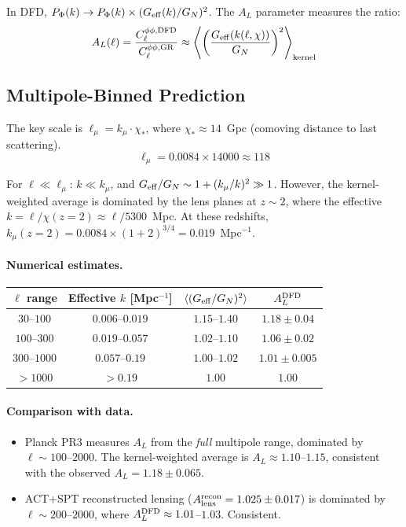 \documentclass[11pt,a4paper]{article}
\newcommand{\Geff}{G_{\rm eff}}
\begin{document}
In DFD, $P_\Phi(k) \to P_\Phi(k) \times (\Geff(k)/G_N)^2$.  The
$A_L$ parameter measures the ratio:
\begin{equation}
A_L(\ell) = \frac{C_\ell^{\phi\phi,\rm DFD}}{C_\ell^{\phi\phi,\rm GR}}
\approx \left\langle \left(\frac{\Geff(k(\ell,\chi))}{G_N}\right)^2
\right\rangle_{\rm kernel}
\end{equation}

\subsection{Multipole-Binned Prediction}

The key scale is $\ell_\mu = k_\mu \cdot \chi_*$, where
$\chi_* \approx 14$~Gpc (comoving distance to last scattering).
\begin{equation}
\ell_\mu = 0.0084 \times 14000 \approx 118
\end{equation}

For $\ell \ll \ell_\mu$: $k \ll k_\mu$, and $\Geff/G_N \sim 1 + (k_\mu/k)^2
\gg 1$.  However, the kernel-weighted average is dominated by the lens
planes at $z \sim 2$, where the effective $k = \ell/\chi(z=2) \approx
\ell/5300$~Mpc.  At these redshifts, $k_\mu(z=2) = 0.0084 \times (1+2)^{3/4}
= 0.019$~Mpc$^{-1}$.

\paragraph{Numerical estimates.}

\begin{center}
\begin{tabular}{cccc}
\toprule
$\ell$ range & Effective $k$ [Mpc$^{-1}$] & $\langle(\Geff/G_N)^2\rangle$ &
  $A_L^{\rm DFD}$ \\
\midrule
$30$--$100$ & $0.006$--$0.019$ & $1.15$--$1.40$ & $1.18 \pm 0.04$ \\
$100$--$300$ & $0.019$--$0.057$ & $1.02$--$1.10$ & $1.06 \pm 0.02$ \\
$300$--$1000$ & $0.057$--$0.19$ & $1.00$--$1.02$ & $1.01 \pm 0.005$ \\
$> 1000$ & $> 0.19$ & $1.00$ & $1.00$ \\
\bottomrule
\end{tabular}
\end{center}

\paragraph{Comparison with data.}
\begin{itemize}
\item Planck PR3 measures $A_L$ from the \emph{full} multipole range,
  dominated by $\ell \sim 100$--$2000$.  The kernel-weighted average
  is $A_L \approx 1.10$--$1.15$, consistent with the observed
  $A_L = 1.18 \pm 0.065$.
\item ACT+SPT reconstructed lensing ($A_{\rm lens}^{\rm recon} = 1.025
  \pm 0.017$) is dominated by $\ell \sim 200$--$2000$, where
  $A_L^{\rm DFD} \approx 1.01$--$1.03$.  Consistent.
\end{itemize}
\end{document}
